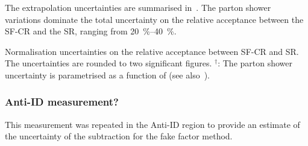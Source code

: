 The extrapolation uncertainties are summarised
in~. The parton shower
variations dominate the total uncertainty on the relative acceptance
between the SF-CR and the SR, ranging from \SIrange{20}{40}{\percent}.

\begin{table}[htbp]
  \centering

  

  \caption{Normalisation uncertainties on the relative acceptance
    between SF-CR and SR. The uncertainties are rounded to two
    significant figures. $^\dagger$: The parton shower uncertainty is
    parametrised as a function of \tauhadvis \pT (see
    also~).}
  \label{tab:ttbarSF_acceptance_uncertainty}
\end{table}




\subsubsection{Anti-ID measurement?}

This measurement was repeated in the Anti-ID region to provide an
estimate of the uncertainty of the subtraction for the fake factor
method.




